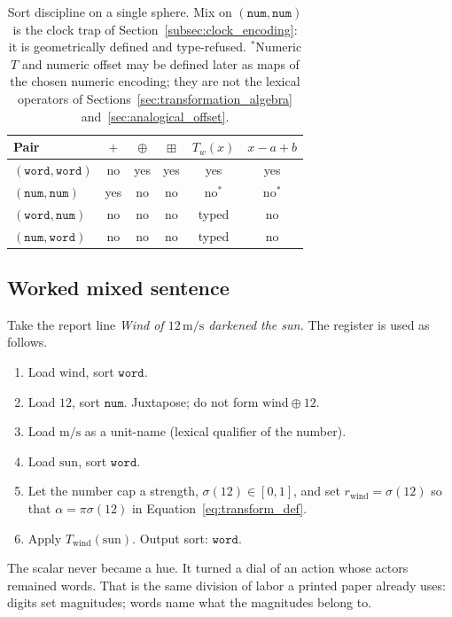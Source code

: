 \documentclass[12pt, a4paper]{article}
\begin{document}
\begin{table}[h]
\centering
\begin{tabular}{lccccc}
\hline
Pair & $+$ & $\oplus$ & $\boxplus$ & $T_w(x)$ & $x-a+b$ \\
\hline
$(\mathtt{word},\mathtt{word})$ & no & yes & yes & yes & yes \\
$(\mathtt{num},\mathtt{num})$   & yes & no  & no  & no$^{*}$ & no$^{*}$ \\
$(\mathtt{word},\mathtt{num})$  & no & no  & no  & typed & no \\
$(\mathtt{num},\mathtt{word})$  & no & no  & no  & typed & no \\
\hline
\end{tabular}
\caption{Sort discipline on a single sphere.
Mix on $(\mathtt{num},\mathtt{num})$ is the clock trap of
Section~\ref{subsec:clock_encoding}: it is geometrically defined and
type-refused. $^{*}$Numeric $T$ and numeric offset may be defined later as
maps of the chosen numeric encoding; they are not the lexical
operators of Sections~\ref{sec:transformation_algebra}
and~\ref{sec:analogical_offset}.}
\label{tab:type_table}
\end{table}

\subsection{Worked mixed sentence}
\label{subsec:mixed_sentence}
Take the report line \emph{Wind of $12\,\mathrm{m/s}$ darkened the sun.}
The register is used as follows.

\begin{enumerate}
    \item Load $\mathrm{wind}$, sort $\mathtt{word}$.
    \item Load $12$, sort $\mathtt{num}$. Juxtapose; do not form
          $\mathrm{wind}\oplus 12$.
    \item Load $\mathrm{m/s}$ as a unit-name (lexical qualifier of the
          number).
    \item Load $\mathrm{sun}$, sort $\mathtt{word}$.
    \item Let the number cap a strength,
          $\sigma(12)\in[0,1]$, and set
          $r_{\mathrm{wind}}=\sigma(12)$ so that
          $\alpha=\pi\sigma(12)$ in Equation~\eqref{eq:transform_def}.
    \item Apply $T_{\mathrm{wind}}(\mathrm{sun})$. Output sort:
          $\mathtt{word}$.
\end{enumerate}
The scalar never became a hue. It turned a dial of an action whose
actors remained words. That is the same division of labor a printed
paper already uses: digits set magnitudes; words name what the
magnitudes belong to.
\end{document}
